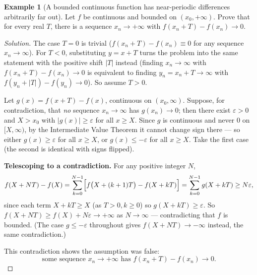 \documentclass[11pt]{article}
\theoremstyle{definition}
\newtheorem{example}{Example}[section]
\begin{document}
\begin{example}[A bounded continuous function has near-periodic differences arbitrarily far out]
Let $f$ be continuous and bounded on $(x_0,+\infty)$. Prove that for every real $T$, there is a sequence $x_n\to+\infty$ with $f(x_n+T)-f(x_n)\to0$.
\end{example}
\begin{proof}[Solution]
The case $T=0$ is trivial ($f(x_n+T)-f(x_n)\equiv0$ for any sequence $x_n\to\infty$). For $T<0$, substituting $y=x+T$ turns the problem into the same statement with the positive shift $|T|$ instead (finding $x_n\to\infty$ with $f(x_n+T)-f(x_n)\to0$ is equivalent to finding $y_n=x_n+T\to\infty$ with $f(y_n+|T|)-f(y_n)\to0$). So assume $T>0$.

Let $g(x)=f(x+T)-f(x)$, continuous on $(x_0,\infty)$. Suppose, for contradiction, that \emph{no} sequence $x_n\to\infty$ has $g(x_n)\to0$; then there exist $\varepsilon>0$ and $X>x_0$ with $|g(x)|\ge\varepsilon$ for all $x\ge X$. Since $g$ is continuous and never $0$ on $[X,\infty)$, by the Intermediate Value Theorem it cannot change sign there — so either $g(x)\ge\varepsilon$ for all $x\ge X$, or $g(x)\le-\varepsilon$ for all $x\ge X$. Take the first case (the second is identical with signs flipped).

\textbf{Telescoping to a contradiction.} For any positive integer $N$,
\[
f(X+NT)-f(X)=\sum_{k=0}^{N-1}\Bigl[f\bigl(X+(k+1)T\bigr)-f(X+kT)\Bigr]=\sum_{k=0}^{N-1}g(X+kT)\ge N\varepsilon,
\]
since each term $X+kT\ge X$ (as $T>0,k\ge0$) so $g(X+kT)\ge\varepsilon$. So $f(X+NT)\ge f(X)+N\varepsilon\to+\infty$ as $N\to\infty$ — contradicting that $f$ is bounded. (The case $g\le-\varepsilon$ throughout gives $f(X+NT)\to-\infty$ instead, the same contradiction.)

This contradiction shows the assumption was false:
\[
\boxed{\text{some sequence }x_n\to+\infty\text{ has }f(x_n+T)-f(x_n)\to0}.
\]
\end{proof}
\end{document}
